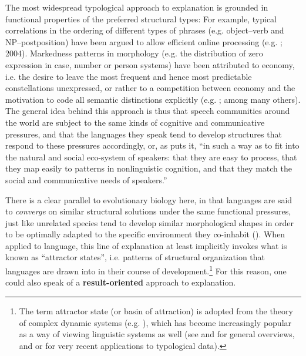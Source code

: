 \documentclass[output=paper]{langsci/langscibook}
\begin{document}
The most widespread typological approach to explanation is grounded in functional properties of the preferred structural types: For example, typical correlations in the ordering of different types of phrases (e.g. object–verb and NP–postposition) have been argued to allow efficient online processing (e.g. \citealt{Hawkins1994}; 2004). Markedness patterns in morphology (e.g. the distribution of zero expression in case, number or person systems) have been attributed to economy, i.e. the desire to leave the most frequent and hence most predictable constellations unexpressed, or rather to a competition between economy and the motivation to code all semantic distinctions explicitly (e.g. \citealt{Haiman1983,Comrie1989,Aissen2003,Croft2003,Haspelmath2008}; among many others). The general idea behind this approach is thus that speech communities around the world are subject to the same kinds of cognitive and communicative pressures, and that the languages they speak tend to develop structures that respond to these pressures accordingly, or, as \citet[118]{Bickel2014} puts it, “in such a way as to fit into the natural and social eco-system of speakers: that they are easy to process, that they map easily to patterns in nonlinguistic cognition, and that they match the social and communicative needs of speakers.” 

There is a clear parallel to evolutionary biology here, in that languages are said to \textit{converge} on similar structural solutions under the same functional pressures, just like unrelated species tend to develop similar morphological shapes in order to be optimally adapted to the specific environment they co-inhabit (\citealt{Deacon1997,Caldwell2008,EvansLevinson2009,Givón2010}). When applied to language, this line of explanation at least implicitly invokes what is known as “attractor states”, i.e. patterns of structural organization that languages are drawn into in their course of development.\footnote{The term attractor state (or basin of attraction) is adopted from the theory of complex dynamic systems (e.g.  \citealt{Cooper1999,HoweLewis2005,Holland2006}), which has become increasingly popular as a way of viewing linguistic systems as well (see \citealt{BecknerEtAl2009} and \citealt{Port2009} for general overviews, and \citealt{Haig2018} or \citealt{Nichols2018} for very recent applications to typological data).} For this reason, one could also speak of a \textbf{result-oriented} approach to explanation. 
\end{document}
